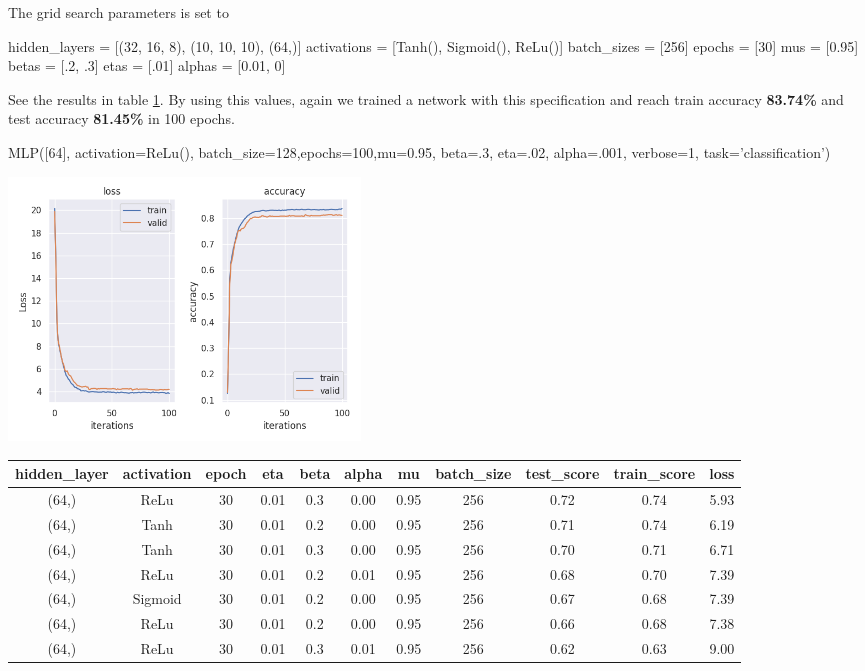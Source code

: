 \documentclass[10pt]{SelfArx} %
\begin{document}
The grid search parameters is set to

\begin{python}
hidden_layers = [(32, 16, 8),
             (10, 10, 10), (64,)]
activations = [Tanh(), Sigmoid(),
               ReLu()]
batch_sizes = [256]
epochs = [30]
mus = [0.95]
betas = [.2, .3]
etas = [.01]
alphas = [0.01, 0]
\end{python}
See the results in table \ref{tsatlog}. By using this values, again we trained a network with this specification and reach train accuracy \textbf{83.74\%} and test accuracy \textbf{81.45\%} in 100 epochs.

\begin{python}
MLP([64], activation=ReLu(), 
batch_size=128,epochs=100,mu=0.95,
beta=.3, eta=.02, alpha=.001,
verbose=1, task='classification')
\end{python}

\begin{center}\centering
	\includegraphics[width=\linewidth,height=7cm]{img/satlog-plots2}
\end{center}


\begin{table}[hbt]\centering
  \begin{tabular*}{1\textwidth}{@{\extracolsep{\fill} }ccccccccccc@{}}
		\toprule
		hidden\_layer & activation & epoch & eta & beta & alpha & mu & batch\_size & test\_score & train\_score & loss \\ \midrule
		(64,) & ReLu & 30 & 0.01 & 0.3 & 0.00 & 0.95 & 256 & 0.72 & 0.74 & 5.93 \\
		(64,) & Tanh & 30 & 0.01 & 0.2 & 0.00 & 0.95 & 256 & 0.71 & 0.74 & 6.19 \\
		(64,) & Tanh & 30 & 0.01 & 0.3 & 0.00 & 0.95 & 256 & 0.70 & 0.71 & 6.71 \\
		(64,) & ReLu & 30 & 0.01 & 0.2 & 0.01 & 0.95 & 256 & 0.68 & 0.70 & 7.39 \\
		(64,) & Sigmoid & 30 & 0.01 & 0.2 & 0.00 & 0.95 & 256 & 0.67 & 0.68 & 7.39 \\
		(64,) & ReLu & 30 & 0.01 & 0.2 & 0.00 & 0.95 & 256 & 0.66 & 0.68 & 7.38 \\
		(64,) & ReLu & 30 & 0.01 & 0.3 & 0.01 & 0.95 & 256 & 0.62 & 0.63 & 9.00 \\ \bottomrule
	\end{tabular*}
    \label{tsatlog}
\end{table}
\end{document}

